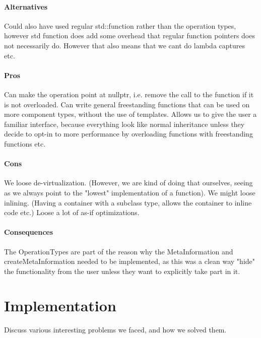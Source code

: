 \subsubsection{Alternatives}
Could also have used regular std::function rather than the operation types,
however std function does add some overhead that regular function pointers does not necessarily do. However that also means that we cant do lambda captures etc.

\subsubsection{Pros}
Can make the operation point at nullptr, i.e. remove the call to the function if it is not overloaded.
Can write general freestanding functions that can be used on more component types, without the use of templates.
Allows us to give the user a familiar interface, because everything look like normal inheritance unless they decide to opt-in to more performance by overloading functions with freestanding functions etc.

\subsubsection{Cons}
We loose de-virtualization. (However, we are kind of doing that ourselves, seeing as we always point to the "lowest" implementation of a function).
We might loose inlining. (Having a container with a subclass type, allows the container to inline code etc.)
Loose a lot of as-if optimizations.

\subsubsection{Consequences}
The OperationTypes are part of the reason why the MetaInformation and createMetaInformation needed to be implemented,
as this was a clean way "hide" the functionality from the user unless they want to explicitly take part in it.

\chapter{Implementation}
\label{chap:implementation}
Discuss various interesting problems we faced, and how we solved them.

